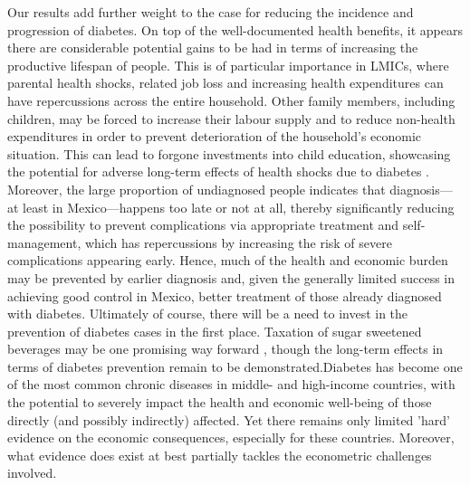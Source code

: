 Our results add further weight to the case for reducing the incidence and progression of diabetes. On top of the well-documented health benefits, it appears there are considerable potential gains to be had in terms of increasing the productive lifespan of people. This is of particular importance in \acp{LMIC}, where parental health shocks, related job loss and increasing health expenditures can have repercussions across the entire household. Other family members, including children, may be forced to increase their labour supply and to reduce non-health expenditures in order to prevent deterioration of the household's economic situation. This can lead to forgone investments into child education, showcasing the potential for adverse long-term effects of health shocks due to diabetes \parencite{Bratti2014}. Moreover, the large proportion of undiagnosed people indicates that diagnosis---at least in Mexico---happens too late or not at all, thereby significantly reducing the possibility to prevent complications via appropriate treatment and self-management, which has repercussions by increasing the risk of severe complications appearing early. Hence, much of the health and economic burden may be prevented by earlier diagnosis and, given the generally limited success in achieving good control in Mexico, better treatment of those already diagnosed with diabetes. Ultimately of course, there will be a need to invest in the prevention of diabetes cases in the first place. Taxation of sugar sweetened beverages may be one promising way forward \parencite{Colchero2016}, though the long-term effects in terms of diabetes prevention remain to be demonstrated.Diabetes has become one of the most common chronic diseases in middle- and high-income countries, with the potential to severely impact the health and economic well-being of those directly (and possibly indirectly) affected. Yet there remains only limited 'hard' evidence on the economic consequences, especially for these countries. Moreover, what evidence does exist at best partially tackles the econometric challenges involved. 








